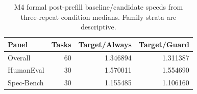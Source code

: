 \begin{table}[ht]\centering\small
\caption{M4 formal post-prefill baseline/candidate speeds from three-repeat condition medians. Family strata are descriptive.}\label{tab:m4_strata}
\begin{tabular}{@{}lrrr@{}}\toprule
Panel & Tasks & Target/Always & Target/Guard\\\midrule
Overall & 60 & 1.346894 & 1.311387\\
HumanEval & 30 & 1.570011 & 1.554690\\
Spec-Bench & 30 & 1.155485 & 1.106160\\
\bottomrule\end{tabular}

\end{table}
